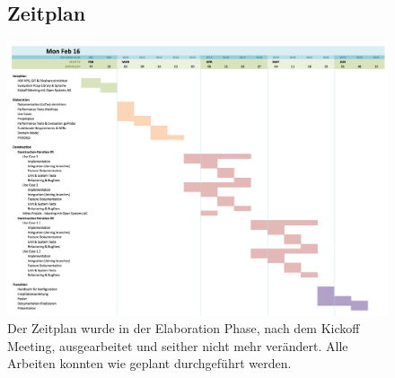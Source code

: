 \clearpage
\begin{figure}
\centering
\subsection{Zeitplan}
\includegraphics[scale=0.45]{mainpart/projektmanagement/img/ganttdiagramm}
Der Zeitplan wurde in der Elaboration Phase, nach dem Kickoff Meeting, ausgearbeitet und seither nicht mehr verändert. Alle Arbeiten konnten wie geplant durchgeführt werden.
\end{figure}
\clearpage

